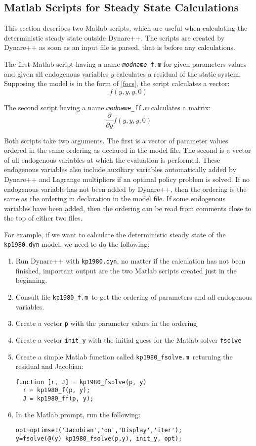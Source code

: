 \documentclass[10pt]{article}
\begin{document}
\subsection{Matlab Scripts for Steady State Calculations}
\label{output_matlab_scripts}

This section describes two Matlab scripts, which are useful when
calculating the deterministic steady state outside Dynare++. The
scripts are created by Dynare++ as soon as an input file is parsed,
that is before any calculations.

The first Matlab script having a name {\tt {\it modname}\_f.m} for
given parameters values and given all endogenous variables $y$
calculates a residual of the static system. Supposing the model is in
the form of \eqref{focs}, the script calculates a vector:
\[
f(y,y,y,0)
\]

The second script having a name {\tt {\it modname}\_ff.m} calculates a matrix:
\[
\frac{\partial}{\partial y}f(y,y,y,0)
\]

Both scripts take two arguments. The first is a vector of parameter
values ordered in the same ordering as declared in the model file. The
second is a vector of all endogenous variables at which the evaluation
is performed. These endogenous variables also include auxiliary
variables automatically added by Dynare++ and Lagrange multipliers if
an optimal policy problem is solved. If no endogenous variable has not
been added by Dynare++, then the ordering is the same as the ordering
in declaration in the model file. If some endogenous variables have
been added, then the ordering can be read from comments close to the
top of either two files.

For example, if we want to calculate the deterministic steady state of
the {\tt kp1980.dyn} model, we need to do the following:
\begin{enumerate}
\item Run Dynare++ with {\tt kp1980.dyn}, no matter if the calculation
has not been finished, important output are the two Matlab scripts
created just in the beginning.
\item Consult file {\tt kp1980\_f.m}\ to get the ordering of parameters
and all endogenous variables.
\item Create a vector {\tt p} with the parameter values in the ordering
\item Create a vector {\tt init\_y} with the initial guess for the
Matlab solver {\tt fsolve}
\item Create a simple Matlab function called {\tt kp1980\_fsolve.m}\ 
returning the residual and Jacobian:
{\small
\begin{verbatim}
function [r, J] = kp1980_fsolve(p, y)
  r = kp1980_f(p, y);
  J = kp1980_ff(p, y);
\end{verbatim}
}
\item In the Matlab prompt, run the following:
{\small
\begin{verbatim}
opt=optimset('Jacobian','on','Display','iter');
y=fsolve(@(y) kp1980_fsolve(p,y), init_y, opt);
\end{verbatim}
}
\end{enumerate}
 
\end{document}
